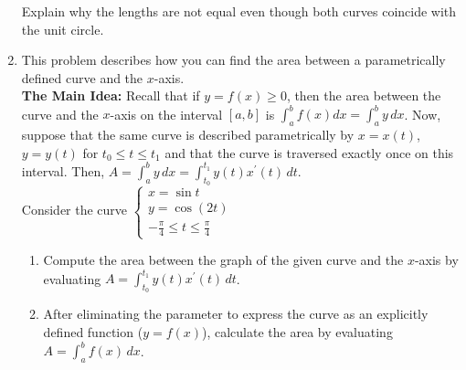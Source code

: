 \documentclass[12pt]{article}
\newif\ifans
\begin{document}
\begin{enumerate}
Explain why the lengths are not equal even though both curves coincide with the unit circle.

\ifans{\fbox{\parbox{1\linewidth}{The length of $C_1(t)$ is $2\pi$ and the length of $C_2(t)=6\pi$.  Notice that $C_2(t)$ is the just curve $C_1(t)$ traversed three times.}}} \fi

\item This problem describes how you can find the area between a parametrically defined curve and the $x$-axis.\\

{\bf The Main Idea:} Recall that if $y=f(x)\geq 0$, then the area between the curve and the $x$-axis on the interval $[a,b]$ is $\int_a^b f(x)dx=\int_a^b y\,dx$.  Now, suppose that the same curve is described parametrically by $x=x(t)$, $y=y(t)$ for $t_0 \leq t \leq t_1$ and that the curve is traversed exactly once on this interval.  Then, $A=\int_a^b y\,dx=\int_{t_0}^{t_1} y(t)x^{\prime}(t)\,dt$.  \\

Consider the curve $\left\{\begin{array}{l}
x=\sin{t}\\
y=\cos{(2t)}\\
-\frac{\pi}{4} \leq t \leq \frac{\pi}{4} \end{array} \right.$

\begin{enumerate}

\item Compute the area between the graph of the given curve and the $x$-axis by evaluating $A=\int_{t_0}^{t_1} y(t)x^{\prime}(t) \,dt$.

\ifans{\fbox{$A=\int_{-\pi/4}^{\pi/4} \cos{(2t)} \cos{t}\,dt=\frac{2\sqrt{2}}{3}$}} \fi

\item After eliminating the parameter to express the curve as an explicitly defined function ($y=f(x)$), calculate the area by evaluating $A=\int_a^b f(x) \,dx$.

\ifans{\fbox{$A=\int_{-\sqrt{2}/2}^{\sqrt{2}/2} \left(1-2x^2\right) \,dx=\frac{2\sqrt{2}}{3}$}} \fi

\end{enumerate}

\end{enumerate}
\end{document}
